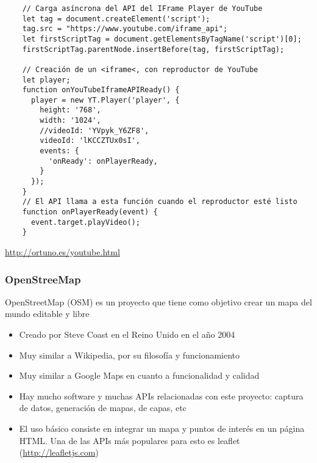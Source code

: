 \documentclass[ucs]{beamer}
\begin{document}
\begin{frame}[fragile]
\frametitle{}

  \begin{scriptsize}
  \begin{verbatim}
    // Carga asíncrona del API del IFrame Player de YouTube
    let tag = document.createElement('script');
    tag.src = "https://www.youtube.com/iframe_api";
    let firstScriptTag = document.getElementsByTagName('script')[0];
    firstScriptTag.parentNode.insertBefore(tag, firstScriptTag);

    // Creación de un <iframe<, con reproductor de YouTube
    let player;
    function onYouTubeIframeAPIReady() {
      player = new YT.Player('player', {
        height: '768',
        width: '1024',
        //videoId: 'YVpyk_Y6ZF8',
        videoId: 'lKCCZTUx0sI',
        events: {
          'onReady': onPlayerReady,
        }
      });
    }
    // El API llama a esta función cuando el reproductor esté listo
    function onPlayerReady(event) {
      event.target.playVideo();
    }
  \end{verbatim}
  \end{scriptsize}

\begin{tiny}
\begin{flushright}
\url{http://ortuno.es/youtube.html}
\end{flushright}
\end{tiny}
\end{frame}



\begin{frame}[fragile]
\frametitle{OpenStreeMap}


OpenStreetMap (OSM) es un proyecto que tiene como objetivo crear
un mapa del mundo editable y libre

\begin{itemize}
\item
Creado por Steve Coast en el Reino Unido en el año 2004

\item
Muy similar a Wikipedia, por su filosofía y funcionamiento

\item
Muy similar a Google Maps en cuanto a funcionalidad y calidad


\item
Hay mucho software y muchas APIs relacionadas con este proyecto:
captura de datos, generación de mapas, de capas, etc


\item
El uso básico consiste en integrar un mapa y puntos de interés
en un página HTML.  Una de las APIs más populares para 
esto es leaflet (\url{http://leafletjs.com})
\end{itemize}

\end{frame}
\end{document}
